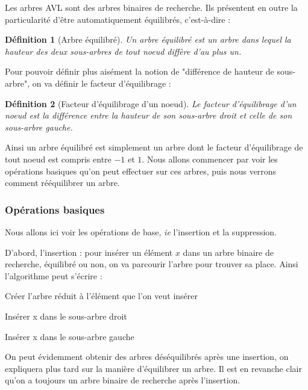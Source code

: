 \documentclass{article}
\newtheorem*{ddef}{Définition}
\begin{document}
Les arbres AVL sont des arbres binaires de recherche. Ils présentent en outre la particularité d'être automatiquement équilibrés, c'est-à-dire :

\begin{ddef}[Arbre équilibré]
Un arbre équilibré est un arbre dans lequel la hauteur des deux sous-arbres de tout noeud diffère d'au plus un.
\end{ddef}

Pour pouvoir définir plus aisément la notion de "différence de hauteur de sous-arbre", on va définir le facteur d'équilibrage :

\begin{ddef}[Facteur d'équilibrage d'un noeud]
Le facteur d'équilibrage d'un noeud est la différence entre la hauteur de son sous-arbre droit et celle de son sous-arbre gauche.
\end{ddef}

Ainsi un arbre équilibré est simplement un arbre dont le facteur d'équilibrage de tout noeud est compris entre $-1$ et $1$. Nous allons commencer par voir les opérations basiques qu'on peut effectuer sur ces arbres, puis nous verrons comment rééquilibrer un arbre.

\subsubsection{Opérations basiques}

Nous allons ici voir les opérations de base, \textit{ie} l'insertion et la suppression.

D'abord, l'insertion : pour insérer un élément $x$ dans un arbre binaire de recherche, équilibré ou non, on va parcourir l'arbre pour trouver sa place. Ainsi l'algorithme peut s'écrire :

\begin{algorithmic}

Créer l'arbre réduit à l'élément que l'on veut insérer


Insérer x dans le sous-arbre droit

\Else

Insérer x dans le sous-arbre gauche
\EndIf
\end{algorithmic}
On peut évidemment obtenir des arbres déséquilibrés après une insertion, on expliquera plus tard sur la manière d'équilibrer un arbre. Il est en revanche clair qu'on a toujours un arbre binaire de recherche après l'insertion.
\end{document}
